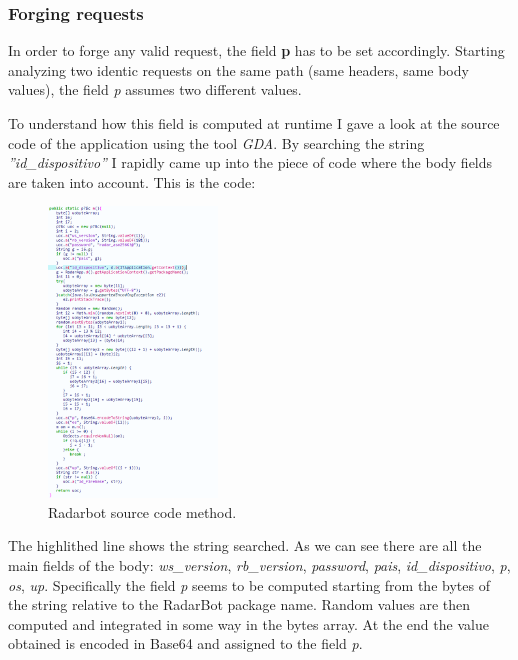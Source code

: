 		\subsubsection{Forging requests}
			\par In order to forge any valid request, the field \textbf{p} has to be set accordingly. Starting analyzing two identic requests on the same path (same headers, same body values), the field \textit{p} assumes two different values. \newline
			\par To understand how this field is computed at runtime I gave a look at the source code of the application using the tool \textit{GDA}. By searching the string \textit{''id\_dispositivo''} I rapidly came up into the piece of code where the body fields are taken into account. This is the code:
			\begin{figure}[H]
				\centering
				\includegraphics[width=0.4\textwidth]{images/radarbot_gda.png}
				\caption{Radarbot source code method.}
			\end{figure}
			\par The highlithed line shows the string searched. As we can see there are all the main fields of the body: \textit{ws\_version}, \textit{rb\_version}, \textit{password}, \textit{pais}, \textit{id\_dispositivo}, \textit{p}, \textit{os}, \textit{up}. Specifically the field \textit{p} seems to be computed starting from the bytes of the string relative to the RadarBot package name. Random values are then computed and integrated in some way in the bytes array. At the end the value obtained is encoded in Base64 and assigned to the field \textit{p}.\newline
